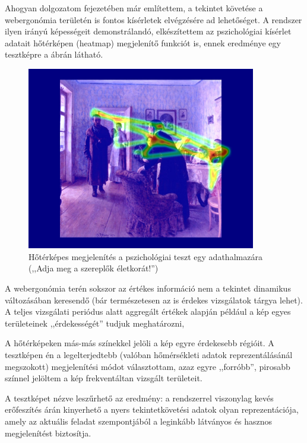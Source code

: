 Ahogyan dolgozatom  fejezetében már említettem, a tekintet követése a webergonómia területén is fontos kísérletek elvégzésére ad lehetőséget. A rendszer ilyen irányú képességeit demonstrálandó, elkészítettem az pszichológiai kísérlet adatait hőtérképen (heatmap) megjelenítő funkciót is, ennek eredménye egy tesztképre a  ábrán látható.

\begin{figure}[!ht]
\centering
\includegraphics[width=100mm, keepaspectratio]{figures/heatmap.jpg}
\caption{Hőtérképes megjelenítés a pszichológiai teszt egy adathalmazára (,,Adja meg a szereplők életkorát!'')}
\label{fig:heatmap}
\end{figure}

A webergonómia terén sokszor az értékes információ nem a tekintet dinamikus változásában keresendő (bár természetesen az is érdekes vizsgálatok tárgya lehet). A teljes vizsgálati periódus alatt aggregált értékek alapján például a kép egyes területeinek ,,érdekességét'' tudjuk meghatározni, 

A hőtérképeken más-más színekkel jelöli a kép egyre érdekesebb régióit. A tesztképen én a legelterjedtebb (valóban hőmérsékleti adatok reprezentálásánál megszokott) megjelenítési módot választottam, azaz egyre ,,forróbb'', pirosabb színnel jelöltem a kép frekventáltan vizsgált területeit.

\bigskip

A tesztképet nézve leszűrhető az eredmény: a rendszerrel viszonylag kevés erőfeszítés árán kinyerhető a nyers tekintetkövetési adatok olyan reprezentációja, amely az aktuális feladat szempontjából a leginkább látványos és hasznos megjelenítést biztosítja.

